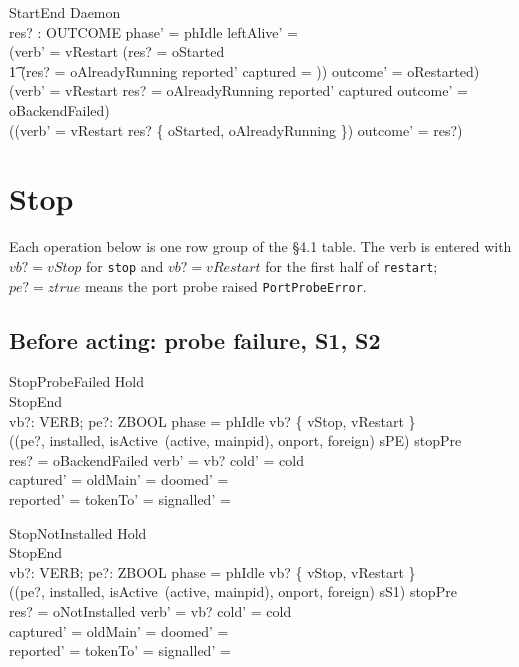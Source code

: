 \documentclass[a4paper,10pt,fleqn]{article}
\begin{document}
\begin{schema}{StartEnd}
  \Delta Daemon \\
  res? : OUTCOME
\where
  phase' = phIdle \land leftAlive' = \emptyset \\
  (verb' = vRestart \land (res? = oStarted \lor \\
  \t1 (res? = oAlreadyRunning \land reported' \cap captured = \emptyset))
    \land outcome' = oRestarted) \lor \\
  (verb' = vRestart \land res? = oAlreadyRunning \land
    reported' \cap captured \neq \emptyset \land
    outcome' = oBackendFailed) \lor \\
  (\lnot (verb' = vRestart \land res? \in \{ oStarted, oAlreadyRunning \})
    \land outcome' = res?)
\end{schema}

\section{Stop}

Each operation below is one row group of the \S4.1 table. The verb is entered
with $vb? = vStop$ for \texttt{stop} and $vb? = vRestart$ for the first half of
\texttt{restart}; $pe? = ztrue$ means the port probe raised
\texttt{PortProbeError}.

\subsection{Before acting: probe failure, S1, S2}

\begin{schema}{StopProbeFailed}
  Hold \\
  StopEnd \\
  vb?: VERB; pe?: ZBOOL
\where
  phase = phIdle \land vb? \in \{ vStop, vRestart \} \\
  ((pe?, installed, isActive~(active, mainpid), onport, foreign) \mapsto sPE) \in stopPre \\
  res? = oBackendFailed \land verb' = vb? \land cold' = cold \\
  captured' = \emptyset \land oldMain' = \emptyset \land doomed' = \emptyset \\
  reported' = \emptyset \land tokenTo' = \emptyset \land
    signalled' = \emptyset
\end{schema}

\begin{schema}{StopNotInstalled}
  Hold \\
  StopEnd \\
  vb?: VERB; pe?: ZBOOL
\where
  phase = phIdle \land vb? \in \{ vStop, vRestart \} \\
  ((pe?, installed, isActive~(active, mainpid), onport, foreign) \mapsto sS1) \in stopPre \\
  res? = oNotInstalled \land verb' = vb? \land cold' = cold \\
  captured' = \emptyset \land oldMain' = \emptyset \land doomed' = \emptyset \\
  reported' = \emptyset \land tokenTo' = \emptyset \land
    signalled' = \emptyset
\end{schema}
\end{document}
